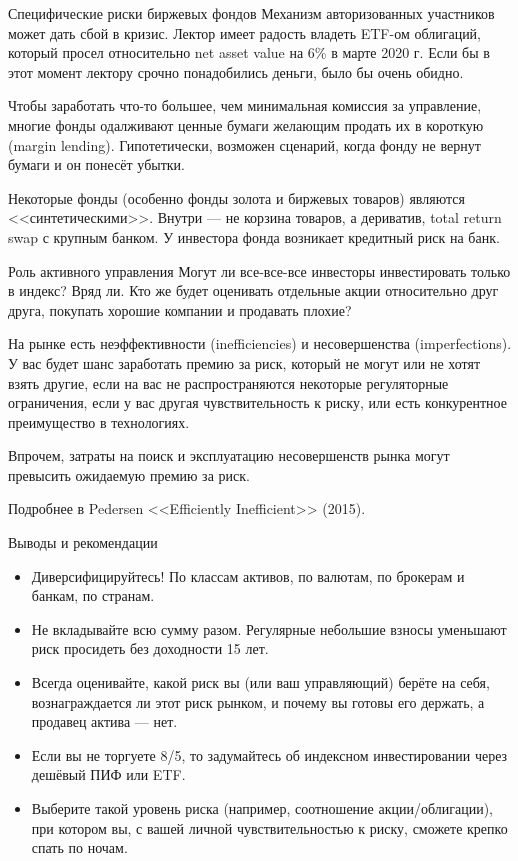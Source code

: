 \documentclass{beamer}
\begin{document}
\begin{frame}{Специфические риски биржевых фондов}
\justify
Механизм авторизованных участников может дать сбой в кризис. Лектор имеет радость владеть ETF-ом облигаций, который просел относительно net asset value на 6\% в марте 2020 г. Если бы в этот момент лектору срочно понадобились деньги, было бы очень обидно.

\justify
Чтобы заработать что-то большее, чем минимальная комиссия за управление, многие фонды одалживают ценные бумаги желающим продать их в короткую (margin lending). Гипотетически, возможен сценарий, когда фонду не вернут бумаги и он понесёт убытки.

\justify
Некоторые фонды (особенно фонды золота и биржевых товаров) являются <<синтетическими>>. Внутри --- не корзина товаров, а дериватив, total return swap с крупным банком. У инвестора фонда возникает кредитный риск на банк.
\end{frame}



\begin{frame}{Роль активного управления}
\justify
Могут ли все-все-все инвесторы инвестировать только в индекс? Вряд ли. Кто же будет оценивать отдельные акции относительно друг друга, покупать хорошие компании и продавать плохие?

\justify
На рынке есть неэффективности (inefficiencies) и несовершенства (imperfections). У вас будет шанс заработать премию за риск, который не могут или не хотят взять другие, если на вас не распространяются некоторые регуляторные ограничения, если у вас другая чувствительность к риску, или есть конкурентное преимущество в технологиях.

\justify
Впрочем, затраты на поиск и эксплуатацию несовершенств рынка могут превысить ожидаемую премию за риск.

\justify
Подробнее в Pedersen <<Efficiently Inefficient>> (2015).
\end{frame}



\begin{frame}{Выводы и рекомендации}
\begin{itemize}
\justifying
\item Диверсифицируйтесь! По классам активов, по валютам, по брокерам и банкам, по странам.
\item Не вкладывайте всю сумму разом. Регулярные небольшие взносы уменьшают риск просидеть без доходности 15 лет.
\item Всегда оценивайте, какой риск вы (или ваш управляющий) берёте на себя, вознаграждается ли этот риск рынком, и почему вы готовы его держать, а продавец актива --- нет.
\item Если вы не торгуете 8/5, то задумайтесь об индексном инвестировании через дешёвый ПИФ или ETF.
\item Выберите такой уровень риска (например, соотношение акции/облигации), при котором вы, с вашей личной чувствительностью к риску, сможете крепко спать по ночам.
\end{itemize}
\end{frame}
\end{document}
